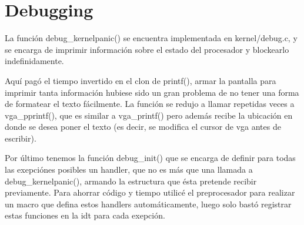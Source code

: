 \section{Debugging}

La función debug\_kernelpanic() se encuentra implementada en kernel/debug.c, y
se encarga de imprimir información sobre el estado del procesador y blockearlo
indefinidamente.

Aquí pagó el tiempo invertido en el clon de printf(), armar la pantalla para
imprimir tanta información hubiese sido un gran problema de no tener una forma
de formatear el texto fácilmente. La función se redujo a llamar repetidas veces
a vga\_pprintf(), que es similar a vga\_printf() pero además recibe la
ubicación en donde se desea poner el texto (es decir, se modifica el cursor de
vga antes de escribir).

Por último tenemos la función debug\_init() que se encarga de definir para
todas las exepciónes posibles un handler, que no es más que una llamada a
debug\_kernelpanic(), armando la estructura que ésta pretende recibir
previamente. Para ahorrar código y tiempo utilicé el preprocesador para
realizar un macro que defina estos handlers automáticamente, luego solo bastó
registrar estas funciones en la idt para cada exepción.
